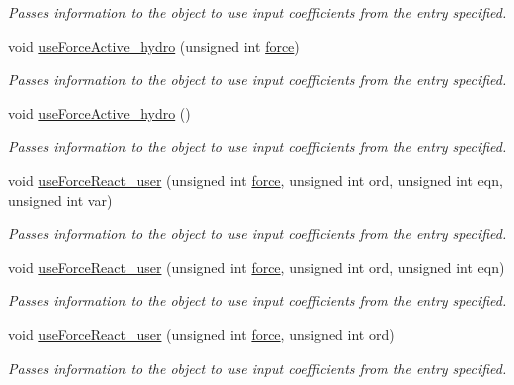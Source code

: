 \begin{DoxyCompactItemize}
\begin{DoxyCompactList}\small\item\em Passes information to the object to use input coefficients from the entry specified. \end{DoxyCompactList}\item 
void \hyperlink{classosea_1_1ofreq_1_1_motion_model_a59ac49cac82e8214a2e1420e2f02736b}{use\-Force\-Active\-\_\-hydro} (unsigned int \hyperlink{input__syntax_8dox_ab0a92c70357da47fe86696522eab7dc8}{force})
\begin{DoxyCompactList}\small\item\em Passes information to the object to use input coefficients from the entry specified. \end{DoxyCompactList}\item 
void \hyperlink{classosea_1_1ofreq_1_1_motion_model_afe1c219c16bd1b3eb63f49065872cec6}{use\-Force\-Active\-\_\-hydro} ()
\begin{DoxyCompactList}\small\item\em Passes information to the object to use input coefficients from the entry specified. \end{DoxyCompactList}\item 
void \hyperlink{classosea_1_1ofreq_1_1_motion_model_a7db1d1ebebe216d17efd7b38f2e9deec}{use\-Force\-React\-\_\-user} (unsigned int \hyperlink{input__syntax_8dox_ab0a92c70357da47fe86696522eab7dc8}{force}, unsigned int ord, unsigned int eqn, unsigned int var)
\begin{DoxyCompactList}\small\item\em Passes information to the object to use input coefficients from the entry specified. \end{DoxyCompactList}\item 
void \hyperlink{classosea_1_1ofreq_1_1_motion_model_a26352f59cd049a551ff692c5feb0b387}{use\-Force\-React\-\_\-user} (unsigned int \hyperlink{input__syntax_8dox_ab0a92c70357da47fe86696522eab7dc8}{force}, unsigned int ord, unsigned int eqn)
\begin{DoxyCompactList}\small\item\em Passes information to the object to use input coefficients from the entry specified. \end{DoxyCompactList}\item 
void \hyperlink{classosea_1_1ofreq_1_1_motion_model_afa99c39f1018471c2ce0793f5de6987b}{use\-Force\-React\-\_\-user} (unsigned int \hyperlink{input__syntax_8dox_ab0a92c70357da47fe86696522eab7dc8}{force}, unsigned int ord)
\begin{DoxyCompactList}\small\item\em Passes information to the object to use input coefficients from the entry specified. \end{DoxyCompactList}\item 

\end{DoxyCompactItemize}
